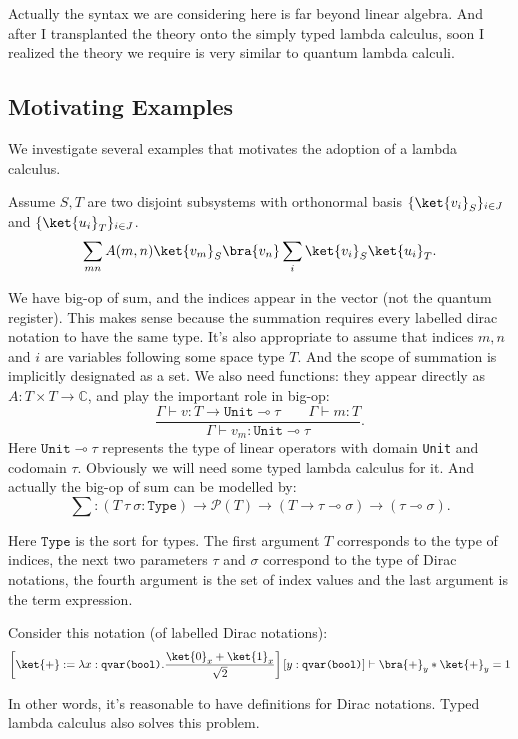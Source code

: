 Actually the syntax we are considering here is far beyond linear algebra.
And after I transplanted the theory onto the simply typed lambda calculus, soon I realized the theory we require is very similar to quantum lambda calculi.


\subsection{Motivating Examples}
We investigate several examples that motivates the adoption of a lambda calculus.

\begin{example}
  Assume $S, T$ are two disjoint subsystems with orthonormal basis $\{\ket{v_i}_S\}_{i \in J}$ and $\{\ket{u_i}_T\}_{i \in J}$.
  $$
  \sum_{mn}A(m, n) \ket{v_m}_S\bra{v_n} \sum_i \ket{v_i}_S \ket{u_i}_T.
  $$
\end{example}
We have big-op of sum, and the indices appear in the vector (not the quantum register). This makes sense because the summation requires every labelled dirac notation to have the same type. It's also appropriate to assume that indices $m, n$ and $i$ are variables following some space type $T$. And the scope of summation is implicitly designated as a set. We also need functions: they appear directly as $A : T \times T \to \mathbb{C}$, and play the important role in big-op:
$$
\frac{\Gamma \vdash v : T \to \texttt{Unit} \multimap \tau \qquad \Gamma \vdash m : T}{\Gamma \vdash v_m : \texttt{Unit} \multimap \tau}.
$$
Here $\texttt{Unit} \multimap \tau$ represents the type of linear operators with domain \texttt{Unit} and codomain $\tau$. Obviously we will need some typed lambda calculus for it. And actually the big-op of sum can be modelled by:
$$
\sum : (T\ \tau\ \sigma : \texttt{Type}) \to \mathcal{P}(T) \to (T \to \tau \multimap \sigma) \to (\tau \multimap \sigma).
$$

Here $\texttt{Type}$ is the sort for types. The first argument $T$ corresponds to the type of indices, the next two parameters $\tau$ and $\sigma$ correspond to the type of Dirac notations, the fourth argument is the set of index values and the last argument is the term expression.

\begin{example}[definitions]
  Consider this notation (of labelled Dirac notations):
  $$
  \left [\ket{+} := \lambda x:\texttt{qvar(bool)}.\frac{\ket{0}_x + \ket{1}_x}{\sqrt{2}} \right ][y : \texttt{qvar(bool)}] \vdash \bra{+}_y * \ket{+}_y = 1
  $$
\end{example}
In other words, it's reasonable to have definitions for Dirac notations. Typed lambda calculus also solves this problem.

